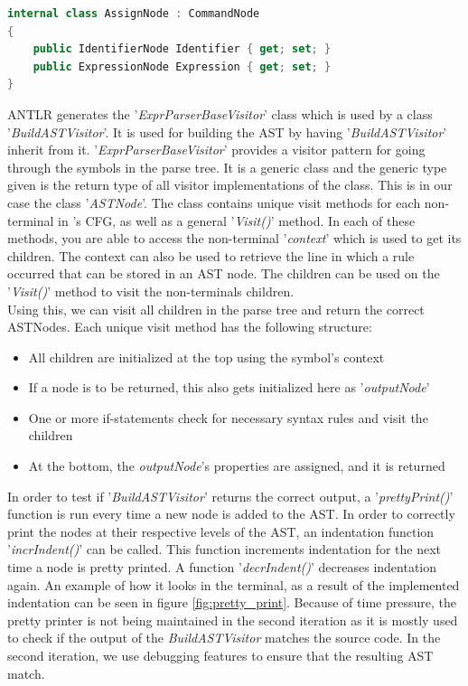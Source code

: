 \begin{lstlisting}[language = csharp, label={list:ASTNodes}, firstnumber=52, caption=SymbolTable Class - CobraCompiler/ASTNodes.cs]
internal class AssignNode : CommandNode
{
    public IdentifierNode Identifier { get; set; }
    public ExpressionNode Expression { get; set; }
}
\end{lstlisting}

\noindent
ANTLR generates the '\textit{ExprParserBaseVisitor}' class which is used by a class '\textit{BuildASTVisitor}'. It is used for building the AST by having '\textit{BuildASTVisitor}' inherit from it. '\textit{ExprParserBaseVisitor}' provides a visitor pattern for going through the symbols in the parse tree. It is a generic class and the generic type given is the return type of all visitor implementations of the class. This is in our case the class '\textit{ASTNode}'. The class contains unique visit methods for each non-terminal in \lang's CFG, as well as a general '\textit{Visit()}' method. In each of these methods, you are able to access the non-terminal '\textit{context}' which is used to get its children. The context can also be used to retrieve the line in which a rule occurred that can be stored in an AST node. The children can be used on the '\textit{Visit()}' method to visit the non-terminals children.\\

\noindent Using this, we can visit all children in the parse tree and return the correct ASTNodes. Each unique visit method has the following structure: 
\begin{itemize}
    \item All children are initialized at the top using the symbol's context
    \item If a node is to be returned, this also gets initialized here as '\textit{outputNode}'
    \item  One or more if-statements check for necessary syntax rules and visit the children
    \item At the bottom, the \textit{outputNode}'s properties are assigned, and it is returned
\end{itemize}

\noindent In order to test if '\textit{BuildASTVisitor}' returns the correct output, a '\textit{prettyPrint()}' function is run every time a new node is added to the AST. In order to correctly print the nodes at their respective levels of the AST, an indentation function '\textit{incrIndent()}' can be called. This function increments indentation for the next time a node is pretty printed. A function '\textit{decrIndent()}' decreases indentation again. An example of how it looks in the terminal, as a result of the implemented indentation can be seen in figure \ref{fig:pretty_print}. Because of time pressure, the pretty printer is not being maintained in the second iteration as it is mostly used to check if the output of the \textit{BuildASTVisitor} matches the source code. In the second iteration, we use debugging features to ensure that the resulting AST match.

